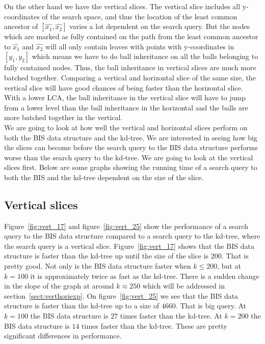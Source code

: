 On the other hand we have the vertical slices. The vertical slice includes all y-coordinates of the search space, and thus the location of the least common ancestor of $[\hat{x_1}, \hat{x_2}]$ varies a lot dependent on the search query. But the nodes which are marked as fully contained on the path from the least common ancestor to $\hat{x_1}$ and $\hat{x_2}$ will all only contain leaves with points with y-coordinates in $[y_1, y_2]$ which means we have to do ball inheritance on all the balls belonging to fully contained nodes. Thus, the ball inheritance in vertical slices are much more batched together. Comparing a vertical and horizontal slice of the same size, the vertical slice will have good chances of being faster than the horizontal slice. With a lower LCA, the ball inheritance in the vertical slice will have to jump from a lower level than the ball inheritance in the horizontal and the balls are more batched together in the vertical. \\

We are going to look at how well the vertical and horizontal slices perform on both the BIS data structure and the kd-tree. We are interested in seeing how big the slices can become before the search query to the BIS data structure performs worse than the search query to the kd-tree. We are going to look at the vertical slices first. Below are some graphs showing the running time of a search query to both the BIS and the kd-tree dependent on the size of the slice. 

\subsection{Vertical slices}

Figure~\ref{fig:vert_17} and figure~\ref{fig:vert_25} show the performance of a search query to the BIS data structure compared to a search query to the kd-tree, where the search query is a vertical slice. Figure~\ref{fig:vert_17} shows that the BIS data structure is faster than the kd-tree up until the size of the slice is $200$. That is pretty good. Not only is the BIS data structure faster when $k \leq 200$, but at $k = 100$ it is approximately twice as fast as the kd-tree. There is a sudden change in the slope of the graph at around $k \approx 250$ which will be addressed in section~\ref{sect:verthoriexp}. On figure~\ref{fig:vert_25} we see that the BIS data structure is faster than the kd-tree up to a size of $4660$. That is big query. At $k = 100$ the BIS data structure is $27$ times faster than the kd-tree. At $k = 200$ the BIS data structure is $14$ times faster than the kd-tree. These are pretty significant differences in performance. \\


